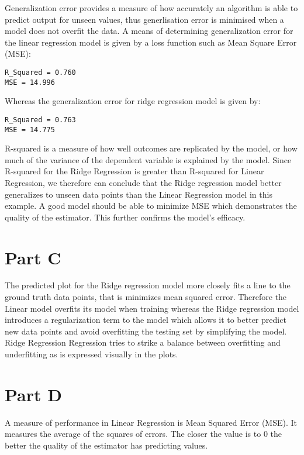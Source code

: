 \documentclass[11pt]{diazessay} %
\begin{document}
Generalization error provides a measure of how accurately an algorithm is able to predict output for unseen values, thus generlisation error is minimised when a model does not overfit the data. 
A means of determining generalization error for the linear regression model is given by a loss function such as Mean Square Error (MSE):


\begin{lstlisting}
R_Squared = 0.760
MSE = 14.996
\end{lstlisting}

Whereas the generalization error for ridge regression model is given by:

\begin{lstlisting}
R_Squared = 0.763
MSE = 14.775
\end{lstlisting}

R-squared is a measure of how well outcomes are replicated by the model, or how much of the variance of the dependent variable is explained by the model. Since R-squared for the Ridge Regression is greater than R-squared for Linear Regression, we therefore can conclude that the Ridge regression model better generalizes to unseen data points than the Linear Regression model in this example. A good model should be able to minimize MSE which demonstrates the quality of the estimator. This further confirms the model's efficacy.


\section*{Part C}

The predicted plot for the Ridge regression model more closely fits a line to the ground truth data points, that is minimizes mean squared error. Therefore the Linear model overfits its model when training whereas the Ridge regression model introduces a regularization term to the model which allows it to better predict new data points and avoid overfitting the testing set by simplifying the model. Ridge Regression Regression tries to strike a balance between overfitting and underfitting as is expressed visually in the plots.

\section*{Part D}

A measure of performance in Linear Regression is Mean Squared Error (MSE). It measures the average of the squares of errors. The closer the value is to 0 the better the quality of the estimator has predicting values. 
\end{document}
